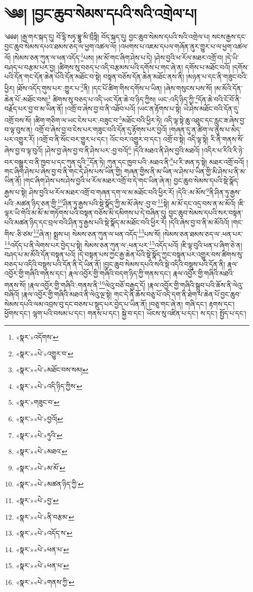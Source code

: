 \chapter{༄༅། །བྱང་ཆུབ་སེམས་དཔའི་སའི་འགྲེལ་པ།}༄༅༅། །རྒྱ་གར་སྐད་དུ། བོ་དྷི་སཏྭ་བྷཱུ་མི་བྲྀཏྟི། བོད་སྐད་དུ། བྱང་ཆུབ་སེམས་དཔའི་སའི་འགྲེལ་པ། སངས་རྒྱས་དང་བྱང་ཆུབ་སེམས་དཔའ་ཐམས་ཅད་ལ་ཕྱག་འཚལ་ལོ། །འཕགས་པ་འཇམ་དཔལ་གཞོན་ནུར་གྱུར་པ་ལ་ཕྱག་འཚལ་ལོ། །སེམས་ཅན་ཀུན་ལ་ཕན་འདོད་\footnote{«སྣར་»འདོགས་}པས། །མ་མོ་གང་ཞིག་ཤེས་པ་དེ། །ཤེས་བྱའི་ཕ་རོལ་མཐར་འགྲོ་བ། །དེ་ཡི་བཤད་པ་བརྩམ་པར་བྱ། །ཚིགས་སུ་བཅད་པ་འདི་བརྩམས་པའི་དགོས་པ་གང་ཞེ་ན། དགོས་པ་མཐོང་བའོ། །དགོས་པའི་དོན་གང་དོན་ཆེན་པོའི་དོན་མཐོང་བ་སྟེ། བསྟན་བཅོས་དོན་ཆེན་མཐོང་ནས་ནི། །མཉན་པ་དང་ནི་གཟུང་བའི་ཕྱིར། །ཐོས་འདོད་གུས་པར་:གྱུར་པ་\footnote{«སྣར་»«པེ་»འགྱུར་བ་}ནི། །དང་པོ་ཚིག་གིས་དགོས་པ་ཡིན། །ཞེས་གསུངས་པས་སོ། །མ་མོའི་དོན་ཆེན་པོ་:མཐོང་བས།\footnote{«སྣར་»«པེ་»མཐོང་བས་སམ།} ཚིགས་སུ་བཅད་པ་འདི་ཡང་དོན་ཆེ་བ་ཉིད་ཀྱིས། ཡང་:འདི་ཉིད་ཀྱི་\footnote{«སྣར་»«པེ་»འདི་ཉིད་ཀྱིས་}དོན་ཆེ་བའི་ངོ་བོ་ནི་བརྗོད་པར་བྱ་བ་མ་ཡིན་ནོ། །འགྲོ་བ་ཞེས་བྱ་བ་ནི་འཐོབ་པའོ། །ཡང་ན་རྟོགས་པ་སྟེ། ཡེ་ཤེས་མཐོང་བའི་དོན་དུ་འགྲོ་བས་སོ། །ཚིག་གཅིག་ལ་ཡང་ངེས་པར་:བཟུང་བ་\footnote{«སྣར་»གཟུང་བ་}མཐོང་བའི་ཕྱིར་ཏེ། འདི་ལྟ་སྟེ་ཆུ་འཐུང་དང་རླུང་ཟ་ཞེས་བྱ་བ་ལྟ་བུས་ན། འགྲོ་བ་ཞེས་བྱ་བ་ངེས་པར་གཟུང་བའི་དོན་དུ་རྟོགས་པར་བྱའོ། །གཞན་དུ་ན་ཚིག་ལ་ནུས་པ་མེད་པར་འགྱུར་རོ། །འགྲོ་བ་ནི་སོང་བར་གྱུར་པ་དང་། འོང་བར་འགྱུར་བ་དང་། འགྲོ་བ་སྟེ། འདི་ལྟ་སྟེ། རི་ནི་གནས་སོ་ཞེས་བྱ་བ་ལྟ་བུའོ། །ཤེས་བྱ་ཞེས་བྱ་བ་ནི་ཤེས་པར་:བྱ་བའོ།\footnote{«སྣར་»«པེ་»བྱའོ།} །དེའི་མཐའ་ནི་ཤེས་བྱའི་མཐའོ། །འདིར་པ་རིའི་རི་ཉེ་བར་བསྒྱུར་བ་ནི་ཁྱབ་པ་དང་ཀུན་དུའི་\footnote{«སྣར་»«པེ་»ཏུའི་}དོན་ཏེ། ཀུན་དང་ཁྱབ་པའི་:མཐའ་ནི་\footnote{«སྣར་»«པེ་»མཐའ་}པ་རི་ཨན་ཏ་སྟེ། མཐར་འགྲོ་བའོ། །གང་ཞིག་ཤེས་པ་ཞེས་བྱ་བ་ནི་གང་དེ་ཤེས་པས་ཡིན་གྱི། གཞན་གྱིས་ནི་མ་ཡིན་ལ་ཤེས་པ་ཡིན་གྱི་མི་ཤེས་པ་ནི་མ་ཡིན་ནོ། །གང་ཞིག་ཤེས་པས་ཤེས་བྱའི་ཕ་རོལ་མཐར་འགྲོ་བ་དེ་གང་ཡིན་ཞེ་ན། བྱང་ཆུབ་སེམས་དཔའི་སྡེ་སྣོད་རྒྱས་པ་སྟེ། ཤེས་བྱའི་ཕ་རོལ་མཐར་འགྲོ་བ་གཞན་དག་ལ་མ་མཐོང་བའི་ཕྱིར་རོ། །དེའི་:མ་མོས་\footnote{«སྣར་»«པེ་»མ་མོ་}ནི་ཤིན་ཏུ་རྒྱས་པའི་:མཚན་ཉིད་ཅན་གྱི་\footnote{«སྣར་»«པེ་»མཚན་ཉིད་ཀྱི་}ཤིན་ཏུ་རྒྱས་པའི་སྡེ་སྣོད་ཀྱི་མ་མོ་ཞེས་:བྱ་བ་\footnote{«སྣར་»«པེ་»བྱ་}སྟེ། མ་མོ་དང་འདྲ་བས་ན་མ་མོའོ། །ཇི་ལྟར་ཡི་གེའི་མ་མོ་མ་གཏོགས་པའི་བསྟན་བཅོས་མི་དམིགས་པ་དེ་བཞིན་དུ། བྱང་ཆུབ་སེམས་དཔའི་སར་བསྟན་པའི་མཚན་ཉིད་དང་བྲལ་བའི་ཤིན་ཏུ་རྒྱས་པའི་སྡེ་སྣོད་མ་མཐོང་བའི་ཕྱིར་རོ། །དེའི་ཞེས་བྱ་བ་ནི་མ་མོའིའོ། །གང་གིས་:ཅི་ཙམ་\footnote{«སྣར་»«པེ་»ནི་བརྩམ་}ཞེ་ན། སྨྲས་པ། སེམས་ཅན་ཀུན་ལ་ཕན་འདོད་\footnote{«སྣར་»«པེ་»འདོད་ས་}པས་སོ། །སེམས་ཅན་ཐམས་ཅད་ལ་:ཕན་པར་\footnote{«སྣར་»«པེ་»ཕན་པ་}འདོད་པ་ནི་ལེགས་པར་བྱེད་པ་སྟེ། སེམས་ཅན་ཀུན་ལ་:ཕན་པར་\footnote{«སྣར་»«པེ་»ཕན་པ་}འདོད་པའོ། །ཇི་ལྟ་བུའི་ཕན་པ་ཞིག་ཅེ་ན། བཤད་པ་མ་མོའི་དོན་བསྟན་པའོ། །དེ་བསྟན་པས་ཀྱང་རྒྱ་ཆེན་པོའི་སྡེ་སྣོད་ཀྱང་བསྟན་པར་འགྱུར་བས་ཚིགས་སུ་བཅད་པ་འདིའི་བསྡུས་པའི་དོན་ནི་དེ་ཡིན་ནོ། །བྱང་ཆུབ་སེམས་དཔའི་སའི་སྡེ་འདིའི་བསྡུས་པའི་དོན་ནི། རྣལ་འབྱོར་གྱི་གཞིའི་གནས་དང་། རྣལ་འབྱོར་གྱི་གཞིའི་བདག་ཉིད་ཀྱི་གནས་དང་། རྣལ་འབྱོར་གྱི་གཞིའི་མཐའི་གནས་སོ། །རྣལ་འབྱོར་གྱི་གཞིའི་:གནས་ནི་\footnote{«སྣར་»«པེ་»གནས་ཀྱི་}ལེའུ་བཅོ་བརྒྱད་དོ། །རྣལ་འབྱོར་གྱི་གཞིའི་སྒྲུབ་པའི་ཆོས་ནི་ལེའུ་བཞིའོ། །རྣལ་འབྱོར་གྱི་གཞིའི་མཐའ་ནི་ལེའུ་ལྔ་སྟེ། གང་དེ་ནི་ཆོས་བཅུ་པོ་འདི་དག་ནི་ཐེག་པ་ཆེན་པོ་བྱང་ཆུབ་སེམས་དཔའི་ལམ་འབྲས་བུ་དང་བཅས་པ་སྡུད་པར་བྱེད་པ་ཡིན་ནོ། །བཅུ་གང་ཞེ་ན། གཞི་དང་། རྟགས་དང་། ཕྱོགས་དང་། ལྷག་པའི་བསམ་པ་དང་། གནས་པ་དང་། སྐྱེ་བ་དང་། ཡོངས་སུ་འཛིན་པ་དང་། ས་དང་། སྤྱོད་པ་དང་། 